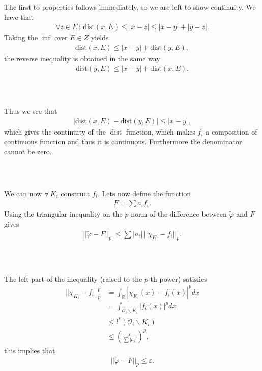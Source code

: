 \documentclass{beamer}
\numberwithin{equation}{section}
\DeclareMathOperator{\dist}{dist}
\begin{document}
\begin{frame}\frametitle{{\normalsize \secname} \\ {\large \subsecname}}
    The first to properties follows immediately, so we are left to show continuity.
    We have that
    \begin{align}
        \forall z \in E \, : \, \text{dist}(x, E) \leq |x-z|\leq |x-y|+|y-z|.
    \end{align}
    Taking the $\inf$ over $E \in Z$ yields
    \begin{align}
        \text{dist}(x, E)\leq |x-y|+\text{dist}(y, E),
    \end{align}
    the reverse inequality is obtained in the same way
    \begin{align}
        \text{dist}(y, E)\leq |x-y|+\text{dist}(x, E).
    \end{align}
\end{frame}

\begin{frame}\frametitle{{\normalsize \secname} \\ {\large \subsecname}}
    Thus we see that
    \begin{align*}
        |\text{dist}(x, E)-\text{dist}(y, E)|\leq |x-y|,
    \end{align*}
    which gives the continuity of the $\dist$ function, which makes $f_i$ a composition of continuous function and thus it is continuous.
    Furthermore the denominator cannot be zero.
\end{frame}

\begin{frame}\frametitle{{\normalsize \secname} \\ {\large \subsecname}}
    We can now $\forall \, K_i$ construct $f_i$.
    Lets now define the function
    \begin{align}
        F = \sum a_i f_i.
    \end{align}
    Using the triangular inequality on the $p$-norm of the difference between $\tilde{\varphi}$ and $F$ gives
    \begin{align}
        ||\tilde{\varphi}-F ||_p \ \leq  \sum |a_i| \, ||\chi_{K_i}-f_i ||_p.
    \end{align}
\end{frame}

\begin{frame}\frametitle{{\normalsize \secname} \\ {\large \subsecname}}
    The left part of the inequality (raised to the $p$-th power) satisfies
    \begin{align}
        ||\chi_{K_i} - f_i ||_p^p &= \int_{\mathbb{R}} | \chi_{K_i}(x) - f_i (x)|^p dx\\
         &= \int_{\mathcal{O}_i \backslash K_i} |f_i (x)|^p dx \\
         &\leq l^*(\mathcal{O}_i \backslash K_i) \\
         &\leq \left(\frac{\varepsilon}{\sum| a_i|}\right)^p,
    \end{align}
    this implies that
    \begin{align}
        ||\tilde{\varphi} - F||_p \leq \varepsilon.
    \end{align}
\end{frame}
\end{document}
